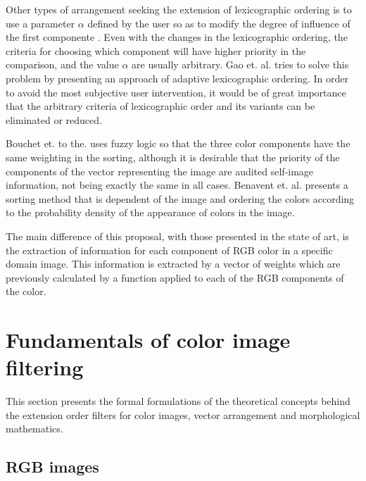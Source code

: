 Other types of arrangement seeking the extension of lexicographic ordering is to use a parameter $\alpha$  defined by the user so as to modify the degree of influence of the first componente \cite{ortiz2002procesamiento,angulo2005unified}. Even with the changes in the lexicographic ordering, the criteria for choosing which component will have higher priority in the comparison, and the value $\alpha$ are usually arbitrary. Gao et. al. \cite{gao2013adaptive} tries to solve this problem by presenting an approach of adaptive lexicographic ordering. 
In order to avoid the most subjective user intervention, it would be of great importance that the arbitrary criteria of lexicographic order and its variants can be eliminated or reduced.


Bouchet et. to the. \Cite{bouchet2016fuzzy} uses fuzzy logic so that the three color components have the same weighting in the sorting, although it is desirable that the priority of the components of the vector representing the image are audited self-image information, not being exactly the same in all cases. Benavent et. al. \cite{benavent2012mathematical} presents a sorting method that is dependent of the image and ordering the colors according to the probability density of the appearance of colors in the image.

The main difference of this proposal, with those presented in the state of art, is the extraction of information for each component of RGB color in a specific domain image. This information is extracted by a vector of weights which are previously calculated by a function applied to each of the RGB components of the color.



\section{Fundamentals of color image filtering}
\label{Teo}

This section presents the formal formulations of the theoretical concepts behind the extension order filters for color images, vector arrangement and morphological mathematics.

\subsection{RGB images}

